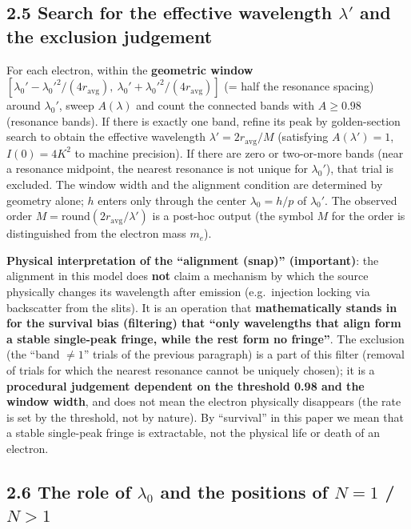 \documentclass[11pt,a4paper]{article}
\begin{document}
\subsection{\texorpdfstring{2.5 Search for the effective wavelength
\(\lambda'\) and the exclusion
judgement}{2.5 Search for the effective wavelength \textbackslash lambda\textquotesingle{} and the exclusion judgement}}\label{search-for-the-effective-wavelength-lambda-and-the-exclusion-judgement}

For each electron, within the \textbf{geometric window}
\([\lambda_0'-\lambda_0'^2/(4r_{\mathrm{avg}}),\ \lambda_0'+\lambda_0'^2/(4r_{\mathrm{avg}})]\)
(= half the resonance spacing) around \(\lambda_0'\), sweep
\(A(\lambda)\) and count the connected bands with \(A\ge0.98\)
(resonance bands). If there is exactly one band, refine its peak by
golden-section search to obtain the effective wavelength
\(\lambda'=2r_{\mathrm{avg}}/M\) (satisfying \(A(\lambda')=1\),
\(I(0)=4K^2\) to machine precision). If there are zero or two-or-more
bands (near a resonance midpoint, the nearest resonance is not unique
for \(\lambda_0'\)), that trial is excluded. The window width and the
alignment condition are determined by geometry alone; \(h\) enters only
through the center \(\lambda_0=h/p\) of \(\lambda_0'\). The observed
order \(M=\mathrm{round}(2r_{\mathrm{avg}}/\lambda')\) is a post-hoc
output (the symbol \(M\) for the order is distinguished from the
electron mass \(m_e\)).

\textbf{Physical interpretation of the ``alignment (snap)''
(important)}: the alignment in this model does \textbf{not} claim a
mechanism by which the source physically changes its wavelength after
emission (e.g.~injection locking via backscatter from the slits). It is
an operation that \textbf{mathematically stands in for the survival bias
(filtering) that ``only wavelengths that align form a stable single-peak
fringe, while the rest form no fringe''}. The exclusion (the ``band
\(\neq1\)'' trials of the previous paragraph) is a part of this filter
(removal of trials for which the nearest resonance cannot be uniquely
chosen); it is a \textbf{procedural judgement dependent on the threshold
0.98 and the window width}, and does not mean the electron physically
disappears (the rate is set by the threshold, not by nature). By
``survival'' in this paper we mean that a stable single-peak fringe is
extractable, not the physical life or death of an electron.

\subsection{\texorpdfstring{2.6 The role of \(\lambda_0\) and the
positions of \(N=1\) /
\(N>1\)}{2.6 The role of \textbackslash lambda\_0 and the positions of N=1 / N\textgreater1}}\label{the-role-of-lambda_0-and-the-positions-of-n1-n1}
\end{document}
